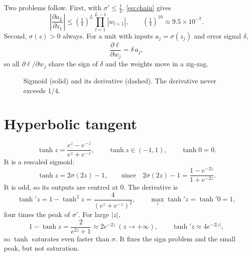 \documentclass[11pt]{article}
\newcommand{\axes}[4]{%
  \draw[->] (#1,0) -- (#2,0) node[right] {$z$};
  \draw[->] (0,#3) -- (0,#4);
  \foreach \t in {-4,-2,2,4} \draw (\t,0.04) -- (\t,-0.04) node[below] {\scriptsize $\t$};
}
\begin{document}
Two problems follow.
First, with $\sigma'\le\tfrac14$, \eqref{eq:chain} gives
\begin{equation}
  \left|\frac{\partial a_L}{\partial z_1}\right|
  \le \left(\tfrac14\right)^{L}\prod_{l=1}^{L-1}|w_{l+1}|,
  \qquad \left(\tfrac14\right)^{10}\approx 9.5\times10^{-7}.
\end{equation}
Second, $\sigma(z)>0$ always. For a unit with inputs $a_j=\sigma(z_j)$ and error signal $\delta$,
\begin{equation}
  \frac{\partial \ell}{\partial w_j}=\delta\,a_j ,
\end{equation}
so all $\partial\ell/\partial w_j$ share the sign of $\delta$ and the weights move in a zig-zag.

\begin{figure}[H]
\centering
{}
\caption{Sigmoid (solid) and its derivative (dashed). The derivative never exceeds $1/4$.}
\end{figure}

\section{Hyperbolic tangent}

\begin{equation}
  \tanh z=\frac{e^{z}-e^{-z}}{e^{z}+e^{-z}}, \qquad \tanh z\in(-1,1), \qquad \tanh 0=0 .
\end{equation}
It is a rescaled sigmoid:
\begin{equation}
  \tanh z = 2\sigma(2z)-1,
  \qquad\text{since}\quad
  2\sigma(2z)-1=\frac{1-e^{-2z}}{1+e^{-2z}} .
  \label{eq:tanh-sigmoid}
\end{equation}
It is odd, so its outputs are centred at $0$. The derivative is
\begin{equation}
  \tanh' z = 1-\tanh^2 z = \frac{4}{(e^{z}+e^{-z})^2},
  \qquad \max_z \tanh' z=\tanh' 0 = 1 ,
\end{equation}
four times the peak of $\sigma'$. For large $|z|$,
\begin{equation}
  1-\tanh z=\frac{2}{e^{2z}+1}\approx 2e^{-2z}\ (z\to+\infty),
  \qquad \tanh' z\approx 4e^{-2|z|},
\end{equation}
so $\tanh$ saturates even faster than $\sigma$. It fixes the sign problem and the small peak, but not saturation.
\end{document}

